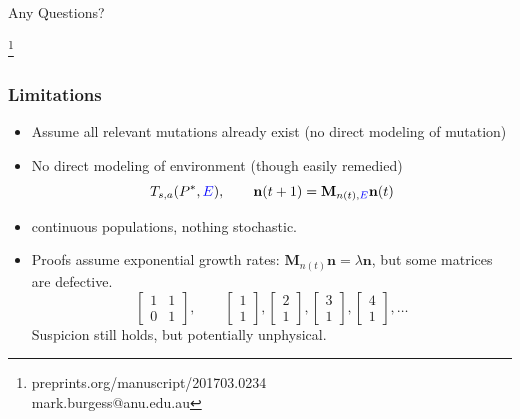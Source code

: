 \documentclass{beamer}
\newcommand\blfootnote[1]{%
  \begingroup
  \renewcommand\thefootnote{}\footnote{#1}%
  \addtocounter{footnote}{-1}%
  \endgroup
}
\begin{document}
\begin{frame}
Any Questions?

\blfootnote{
preprints.org/manuscript/201703.0234\\mark.burgess@anu.edu.au
}

\end{frame}





\begin{frame}
\frametitle{Limitations}
\begin{itemize}
    \item Assume all relevant mutations already exist (no direct modeling of mutation)
    \item No direct modeling of environment (though easily remedied) $$T_{s,a}(P^*,\textcolor{blue}{E}),\qquad\mathbf{n}(t+1)=\mathbf{M}_{n(t),\textcolor{blue}{E}}\mathbf{n}(t)$$
    \item continuous populations, nothing stochastic.
    \item Proofs assume exponential growth rates: $\mathbf{M}_{n(t)}\mathbf{n}=\lambda \mathbf{n}$, but some matrices are defective.
\begin{equation}
\begin{bmatrix}
1&1\\
0&1
\end{bmatrix}
,\qquad 
\begin{bmatrix}
1\\
1
\end{bmatrix},
\begin{bmatrix}
2\\
1
\end{bmatrix},
\begin{bmatrix}
3\\
1
\end{bmatrix},
\begin{bmatrix}
4\\
1
\end{bmatrix},\dots
\end{equation}
Suspicion still holds, but potentially unphysical.
\end{itemize}
\end{frame}
\end{document}
